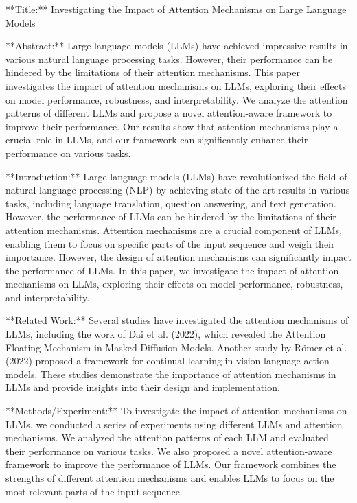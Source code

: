 **Title:** Investigating the Impact of Attention Mechanisms on Large Language Models

**Abstract:**
Large language models (LLMs) have achieved impressive results in various natural language processing tasks. However, their performance can be hindered by the limitations of their attention mechanisms. This paper investigates the impact of attention mechanisms on LLMs, exploring their effects on model performance, robustness, and interpretability. We analyze the attention patterns of different LLMs and propose a novel attention-aware framework to improve their performance. Our results show that attention mechanisms play a crucial role in LLMs, and our framework can significantly enhance their performance on various tasks.

**Introduction:**
Large language models (LLMs) have revolutionized the field of natural language processing (NLP) by achieving state-of-the-art results in various tasks, including language translation, question answering, and text generation. However, the performance of LLMs can be hindered by the limitations of their attention mechanisms. Attention mechanisms are a crucial component of LLMs, enabling them to focus on specific parts of the input sequence and weigh their importance. However, the design of attention mechanisms can significantly impact the performance of LLMs. In this paper, we investigate the impact of attention mechanisms on LLMs, exploring their effects on model performance, robustness, and interpretability.

**Related Work:**
Several studies have investigated the attention mechanisms of LLMs, including the work of Dai et al. (2022), which revealed the Attention Floating Mechanism in Masked Diffusion Models. Another study by Römer et al. (2022) proposed a framework for continual learning in vision-language-action models. These studies demonstrate the importance of attention mechanisms in LLMs and provide insights into their design and implementation.

**Methods/Experiment:**
To investigate the impact of attention mechanisms on LLMs, we conducted a series of experiments using different LLMs and attention mechanisms. We analyzed the attention patterns of each LLM and evaluated their performance on various tasks. We also proposed a novel attention-aware framework to improve the performance of LLMs. Our framework combines the strengths of different attention mechanisms and enables LLMs to focus on the most relevant parts of the input sequence.

